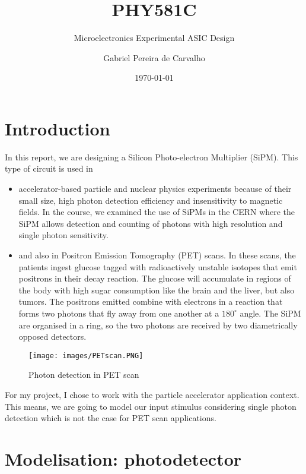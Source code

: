 \documentclass[a4paper,12pt,twoside]{article}
\title{PHY581C}
\subtitle{Microelectronics Experimental ASIC Design}
\author{Gabriel Pereira de Carvalho}
\date{\today}
\begin{document}
	
	\maketitle
	
	\tableofcontents
	
	\newpage
	
	\section{Introduction}
	
	In this report, we are designing a Silicon Photo-electron Multiplier (SiPM). This type of circuit is used in 
	\begin{itemize}
		\item accelerator-based particle and nuclear physics experiments because of their small size, high photon detection efficiency and insensitivity to magnetic fields\cite{SiPM}. In the course, we examined the use of SiPMs in the CERN where the SiPM allows detection and counting of photons with high resolution and single photon sensitivity\cite{SiPM-CERN}.
		\item and also in Positron Emission Tomography (PET) scans. In these scans, the patients ingest glucose tagged with radioactively unstable isotopes that emit positrons in their decay reaction. The glucose will accumulate in regions of the body with high sugar consumption like the brain and the liver, but also tumors. The positrons emitted combine with electrons in a reaction that forms two photons that fly away from one another at a $180^\circ$ angle. The SiPM are organised in a ring, so the two photons are received by two diametrically opposed detectors\cite{PETscan}.
	\end{itemize}
	
	\begin{figure}[h]
		\centering
		\texttt{[image: images/PETscan.PNG]}
		\caption{Photon detection in PET scan\cite{PETscan}}
	\end{figure}
	
	For my project, I chose to work with the particle accelerator application context. This means, we are going to model our input stimulus considering single photon detection which is not the case for PET scan applications.
	
	\section{Modelisation: photodetector}
	
\end{document}
